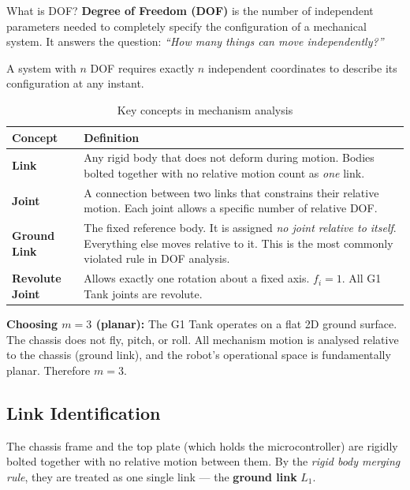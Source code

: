 \documentclass[12pt,a4paper]{article}
\begin{document}
\begin{conceptbox}{What is DOF?}
\textbf{Degree of Freedom (DOF)} is the number of independent parameters needed
to completely specify the configuration of a mechanical system. It answers the
question: \emph{``How many things can move independently?''}

A system with $n$ DOF requires exactly $n$ independent coordinates to describe
its configuration at any instant.
\end{conceptbox}

\vspace{6pt}

\begin{table}[h!]
\centering
\caption{Key concepts in mechanism analysis}
\renewcommand{\arraystretch}{1.3}
\begin{tabularx}{\linewidth}{L{3cm} X}
\toprule
{}
\textbf{Concept} & \textbf{Definition} \\
\midrule
\textbf{Link} & Any rigid body that does not deform during motion. Bodies bolted
  together with no relative motion count as \emph{one} link. \\
\midrule
\textbf{Joint} & A connection between two links that constrains their relative
  motion. Each joint allows a specific number of relative DOF. \\
\midrule
\textbf{Ground Link} & The fixed reference body. It is assigned \emph{no joint
  relative to itself}. Everything else moves relative to it. This is the most
  commonly violated rule in DOF analysis. \\
\midrule
\textbf{Revolute Joint} & Allows exactly one rotation about a fixed axis.
  $f_i = 1$. All G1 Tank joints are revolute. \\
\bottomrule
\end{tabularx}
\end{table}


\textbf{Choosing $m = 3$ (planar):} The G1 Tank operates on a flat 2D ground
surface. The chassis does not fly, pitch, or roll. All mechanism motion is
analysed relative to the chassis (ground link), and the robot's operational
space is fundamentally planar. Therefore $m = 3$.

\subsection{Link Identification}

The chassis frame and the top plate (which holds the microcontroller) are
rigidly bolted together with no relative motion between them. By the
\emph{rigid body merging rule}, they are treated as one single link --- the
\textbf{ground link} $L_1$.
\end{document}
